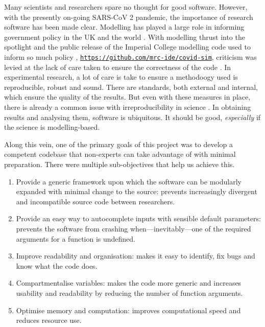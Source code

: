 Many scientists and researchers spare no thought for good software. However, with the presently on-going SARS-CoV 2 pandemic, the importance of research software has been made clear. Modelling has played a large role in informing government policy in the UK and the world \cite{covidScotland,covidUK1,covidUK2}. With modelling thrust into the spotlight and the public release of the Imperial College modelling code used to inform so much policy \cite{covidUK2}, \href{https://github.com/mrc-ide/covid-sim}{\texttt{https://github.com/mrc-ide/covid-sim}}, criticism was levied at the lack of care taken to ensure the correctness of the code \cite{natureModelCritique}. In experimental research, a lot of care is take to ensure a methodoogy used is reproducible, robust and sound. There are standards, both external and internal, which ensure the quality of the results. But even with these measures in place, there is already a common issue with irreproducibility in science \cite{mede2020replication,randall2018irreproducibility,bolli2015reflections}. In obtaining results and analysing them, software is ubiquitous. It should be good, \emph{especially} if the science is modelling-based.

Along this vein, one of the primary goals of this project was to develop a competent codebase that non-experts can take advantage of with minimal preparation. There were multiple sub-objectives that help us achieve this.
\begin{enumerate}
    \item Provide a generic framework upon which the software can be modularly expanded with minimal change to the source: prevents increasingly divergent and incompatible source code between researchers.
    \item Provide an easy way to autocomplete inputs with sensible default parameters: prevents the software from crashing when---inevitably---one of the required arguments for a function is undefined.
    \item Improve readability and organisation: makes it easy to identify, fix bugs and know what the code does.
    \item Compartmentalise variables: makes the code more generic and increases usability and readability by reducing the number of function arguments.
    \item Optimise memory and computation: improves computational speed and reduces resource use.
\end{enumerate}

